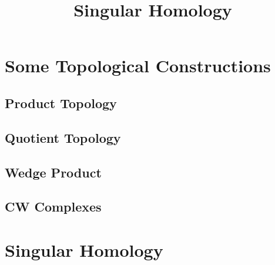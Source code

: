 \documentclass[11pt]{scrreprt}
\begin{document}
\title{Singular Homology}
\maketitle

\chapter{Some Topological Constructions}
\section{Product Topology}
\section{Quotient Topology}
\section{Wedge Product}
\section{CW Complexes}

\chapter{Singular Homology}
\end{document}
